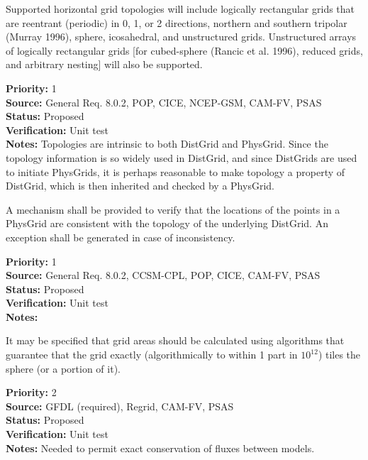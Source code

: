  Supported horizontal grid topologies will include
logically rectangular grids that are reentrant (periodic) in 0, 1, or 2 directions,
northern and southern tripolar (Murray 1996), sphere, icosahedral, and unstructured
grids.  Unstructured arrays of logically rectangular grids [for cubed-sphere (Rancic
et al. 1996), reduced grids, and arbitrary nesting] will also be supported.
\begin{reqlist}
{\bf Priority:} 1 \\
{\bf Source:} General Req. 8.0.2, POP, CICE, NCEP-GSM,
CAM-FV, PSAS  \\
{\bf Status:} Proposed \\
{\bf Verification:} Unit test\\
{\bf Notes:}  Topologies are intrinsic to both DistGrid and PhysGrid.  Since
the topology information is so widely used in DistGrid, and since DistGrids
are used to initiate PhysGrids, it is perhaps reasonable to make topology a
property of DistGrid, which is then inherited and checked by a PhysGrid.
\end{reqlist}

A mechanism shall be provided to verify that the locations of the points in
a PhysGrid are consistent with the topology of the underlying DistGrid.  An
exception shall be generated in case of inconsistency.
\begin{reqlist}
{\bf Priority:} 1 \\
{\bf Source:} General Req. 8.0.2, CCSM-CPL, POP, CICE, 
CAM-FV, PSAS  \\
{\bf Status:} Proposed \\
{\bf Verification:} Unit test\\
{\bf Notes:}
\end{reqlist}

It may be specified that grid areas should be calculated using algorithms that
guarantee that the grid exactly (algorithmically to within 1 part in $10^{12}$) tiles
the sphere (or a portion of it). 
\begin{reqlist}
{\bf Priority:} 2 \\
{\bf Source:} GFDL (required), Regrid, 
CAM-FV, PSAS  \\
{\bf Status:} Proposed \\
{\bf Verification:} Unit test\\
{\bf Notes:} Needed to permit exact conservation of fluxes between models.
\end{reqlist}


